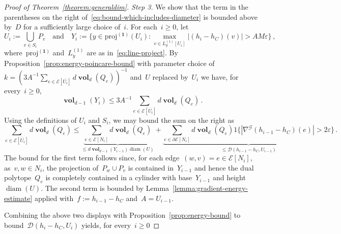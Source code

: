 \documentclass[12pt]{amsart}
\numberwithin{equation}{section}
\DeclareMathOperator{\diam}{{\mathop{diam}}}
\newcommand{\E}{\mathcal{E}}
\newcommand{\eps}{\varepsilon}
\newcommand{\projone}{\boldsymbol{\mathrm{proj}^{(1)}}}
\newcommand{\D}{\hyperref[eq:dir.energy]{\mathcal{D}}}
\newcommand{\Qe}{\hyperref[eq:qeset]{Q_e}}
\newcommand{\Lyone}{\hyperref[eq:line-project]{L_y^{(1)}}}
\DeclareMathOperator{\vol}{\mathbf{vol}}
\begin{document}
\begin{proof}[Proof of Theorem~\ref{theorem:generaldim}]
	
	\emph{Step 3.} 	We show  that the term in the parentheses on the right of~\eqref{eq:bound-which-includes-diameter} is bounded above by~$D$ for a sufficiently large choice of~$i$.  For each~$i \geq 0$, let  
	\[
	U_i := \bigcup_{v \in S_i} P_v \quad \mbox{and} \quad Y_i := \{y \in \projone(U_i): \max_{v \in \Lyone[U_i]} |(h_i - h_C)(v)| >  	{A M \eps} \} \, , 
	\]   	
	where~$\projone$ and~$\Lyone$ are as in~\eqref{eq:line-project}.
	By Proposition~\ref{prop:energy-poincare-bound} with parameter choice of~$k = (3A^{-1} \sum_{e \in \E[\overline{U_i}]} d   \vol_{d}(\Qe))^{-1}$ and~$U$ replaced by~$U_i$ we have, for every~$i \geq 0$,
	\begin{equation*}
	 	\vol_{d-1} \left( Y_i  \right) \leq  {3 A^{-1} \sum_{e \in {\E[\overline{U_i}]}} d   \vol_{d}(\Qe)} \, .
	\end{equation*}
	Using the definitions of $U_i$ and $S_i$, we may bound the sum on the right as  
	\begin{equation}
	\label{eq:bounding-polytope-volume-iteration}
	\sum_{e \in {\E[\overline{U}_i]}} d   \vol_{d}(\Qe) \leq \underbrace{\sum_{e \in \E[N_i]} d \vol_{d}(\Qe)}_{\leq d \vol_{d-1}(Y_{i-1}) \diam(U)} + 
	\underbrace{\sum_{e \in \partial \E[N_i]} d \vol_{d}(\Qe) 1\{ |\nabla^{\mathcal{G}} (h_{i-1} - h_C)(e)| > 2 \eps \}}_{\leq \D(h_{i-1} - h_C, U_{i-1})} \, . 
	\end{equation}
	The bound for the first term follows since, for each edge~$(w,v) = e \in \E[N_i]$,  as~$v,w \in N_i$, the projection of~$P_w \cup P_v$ is contained in~$Y_{i-1}$ and hence the dual polytope~$\Qe$ is completely contained in a cylinder 
	with base~$Y_{i-1}$ and height~$\diam(U)$. The second term is bounded by  Lemma~\ref{lemma:gradient-energy-estimate} applied with~$f := h_{i-1} - h_C$
	and~$A = U_{i-1}$. 
	
	Combining the above two displays with Proposition~\ref{prop:energy-bound} to bound~$\D(h_{i} - h_C, U_{i})$ yields, for every~$i \geq 0$


\end{proof}
\end{document}
